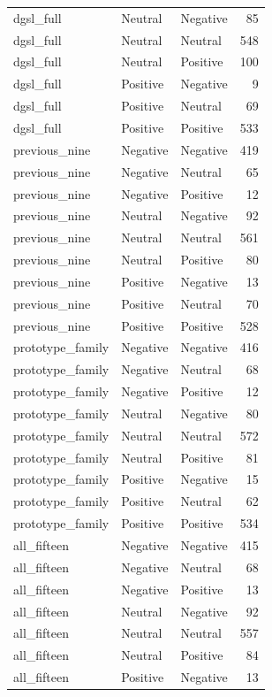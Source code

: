 \begin{tabular}{lllr}
dgsl\_full & Neutral & Negative & 85 \\
dgsl\_full & Neutral & Neutral & 548 \\
dgsl\_full & Neutral & Positive & 100 \\
dgsl\_full & Positive & Negative & 9 \\
dgsl\_full & Positive & Neutral & 69 \\
dgsl\_full & Positive & Positive & 533 \\
previous\_nine & Negative & Negative & 419 \\
previous\_nine & Negative & Neutral & 65 \\
previous\_nine & Negative & Positive & 12 \\
previous\_nine & Neutral & Negative & 92 \\
previous\_nine & Neutral & Neutral & 561 \\
previous\_nine & Neutral & Positive & 80 \\
previous\_nine & Positive & Negative & 13 \\
previous\_nine & Positive & Neutral & 70 \\
previous\_nine & Positive & Positive & 528 \\
prototype\_family & Negative & Negative & 416 \\
prototype\_family & Negative & Neutral & 68 \\
prototype\_family & Negative & Positive & 12 \\
prototype\_family & Neutral & Negative & 80 \\
prototype\_family & Neutral & Neutral & 572 \\
prototype\_family & Neutral & Positive & 81 \\
prototype\_family & Positive & Negative & 15 \\
prototype\_family & Positive & Neutral & 62 \\
prototype\_family & Positive & Positive & 534 \\
all\_fifteen & Negative & Negative & 415 \\
all\_fifteen & Negative & Neutral & 68 \\
all\_fifteen & Negative & Positive & 13 \\
all\_fifteen & Neutral & Negative & 92 \\
all\_fifteen & Neutral & Neutral & 557 \\
all\_fifteen & Neutral & Positive & 84 \\
all\_fifteen & Positive & Negative & 13 \\

\end{tabular}

